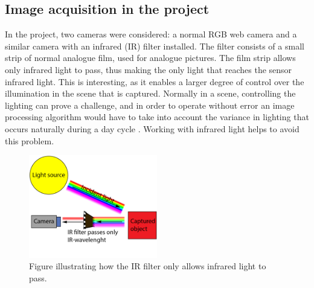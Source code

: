 
\subsection{Image acquisition in the project}
In the project, two cameras were considered: a normal RGB web camera and a similar camera with an infrared (IR) filter installed. The filter consists of a small strip of normal analogue film, used for analogue pictures. The film strip allows only infrared light to pass, thus making the only light that reaches the sensor infrared light. This is interesting, as it enables a larger degree of control over the illumination in the scene that is captured. Normally in a scene, controlling the lighting can prove a challenge, and in order to operate without error an image processing algorithm would have to take into account the variance in lighting that occurs naturally during a day cycle \citep{ip_book}. Working with infrared light helps to avoid this problem.


\begin{figure}[htbp] 
\centering 
\includegraphics[width=0.5\textwidth]{Pictures/Theory/IR_filter.png} 
\caption{Figure illustrating how the IR filter only allows infrared light to pass.} 
\label{fig:ir_filter} 
\end{figure}




